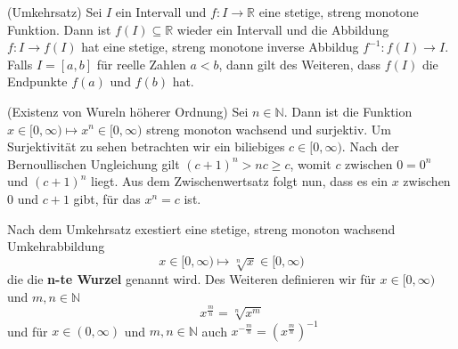 \documentclass[../Analysis1_script.tex]{subfiles}
\begin{document}
\begin{proposition}{(Umkehrsatz)}
	Sei $I$ ein Intervall und $f : I \to \mathbb{R}$ eine stetige, streng monotone Funktion. Dann ist $f(I) \subseteq \mathbb{R}$ wieder ein Intervall und die Abbildung $f: I \to f(I)$ hat eine stetige, streng monotone inverse Abbildug $f^{-1}: f(I) \to I$. Falls $I = [a, b]$ für reelle Zahlen $a < b$, dann gilt des Weiteren, dass $f(I)$ die Endpunkte $f(a)$ und $f(b)$ hat.
\end{proposition}

\begin{example}{(Existenz von Wureln höherer Ordnung)}
	Sei $n \in \mathbb{N}$. Dann ist die Funktion $x \in [0, \infty) \mapsto x^n \in [0, \infty)$ streng monoton wachsend und surjektiv. Um Surjektivität zu sehen betrachten wir ein biliebiges $c \in [0, \infty)$. Nach der Bernoullischen Ungleichung gilt $(c + 1)^n > nc \geq c$, womit $c$ zwischen $0 = 0^n$ und $(c + 1)^n$ liegt. Aus dem Zwischenwertsatz folgt nun, dass es ein $x$ zwischen $0$ und $c + 1$ gibt, für das $x^n = c$ ist.
	
	Nach dem Umkehrsatz exestiert eine stetige, streng monoton wachsend Umkehrabbildung
	\[x \in [0, \infty) \mapsto \sqrt[n]{x} \in [0, \infty)\]
	die die \textbf{n-te Wurzel} genannt wird. Des Weiteren definieren wir für $x \in [0, \infty)$ und $m, n \in \mathbb{N}$
	\[x^{\frac{m}{n}} = \sqrt[n]{x^m}\]
	und für $x \in (0, \infty)$ und $m, n \in \mathbb{N}$ auch $x^{-\frac{m}{n}} = (x^{\frac{m}{n}})^{-1}$
\end{example}
\end{document}
